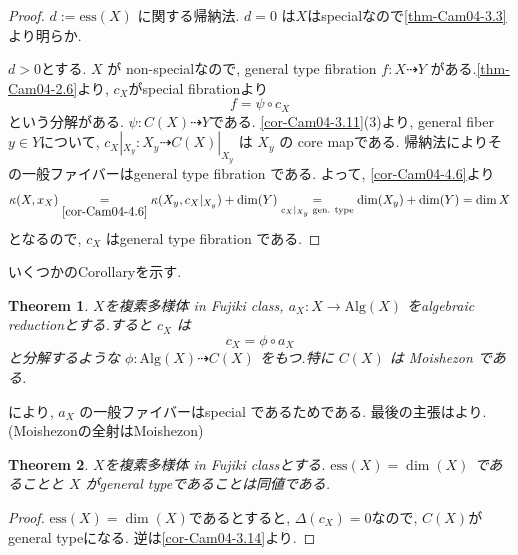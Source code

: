 \documentclass[dvipdfmx,a4paper,11pt]{article} %
\newtheorem{thm}{Theorem}[section]
\newtheorem{prop}[thm]{Proposition}
\theoremstyle{definition}
\theoremstyle{remark}
\numberwithin{equation}{section}
\begin{document}
\begin{proof}
\( d:=\mathrm{ess}(X) \) に関する帰納法.
\( d=0 \) は$X$はspecialなので\ref{thm-Cam04-3.3}より明らか. 

$d >0$とする. \( X \) が non-specialなので, general type fibration \( f:X\dashrightarrow Y \) がある.\ref{thm-Cam04-2.6}より, $c_X$がspecial fibrationより
\[
f=\psi\circ c_X
\]
という分解がある. $\psi : C(X) \dashrightarrow Y$である. 
\ref{cor-Cam04-3.11}(3)より, general fiber $y \in Y$について, \(c_X|_{X_y} : X_y \dashrightarrow C(X)|_{X_y} \) は \( X_y \) の core mapである.
帰納法によりその一般ファイバーはgeneral type fibration である.
よって, \ref{cor-Cam04-4.6}より
$$
\kappa(X,x_X) \underset{\ref{cor-Cam04-4.6}}{=} \kappa(X_y,c_X|_{X_y}) + \dim(Y)
\underset{\text{$c_X|_{X_y}$ gen. type}}{=} \dim(X_y) + \dim(Y) = \dim X
$$
となるので,  \( c_X \) はgeneral type fibration である. 
\end{proof}

いくつかのCorollaryを示す. 

\begin{thm}\cite[Theorem 5.10]{Cam04}
\label{thm-Cam04-5.10}
$X$を複素多様体 in Fujiki class, \( a_X: X\to \mathrm{Alg}(X) \) をalgebraic reductionとする.すると \( c_X \) は
\[
c_X = \phi \circ a_X
\]
と分解するような \( \phi : \mathrm{Alg}(X)\dashrightarrow C(X) \) をもつ.特に \( C(X) \) は Moishezon である.
\end{thm}
\cite[Theorem~2.39]{Cam04} により, \( a_X \) の一般ファイバーはspecial であるためである. 
最後の主張は\cite[Chapter 7 Proposition 6.12]{SCV7}より.(Moishezonの全射はMoishezon)




\begin{thm}\cite[Theorem 5.5]{Cam04}
\label{thm-Cam04-5.5}
$X$を複素多様体 in Fujiki classとする.
 \( \mathrm{ess}(X)=\dim(X) \) であることと \( X \) がgeneral typeであることは同値である.
\end{thm}
\begin{proof}
\( \mathrm{ess}(X)=\dim(X) \)であるとすると, $\Delta(c_X)=0$なので, $C(X)$がgeneral typeになる. 
逆は\ref{cor-Cam04-3.14}より. 
\end{proof}
\end{document}
